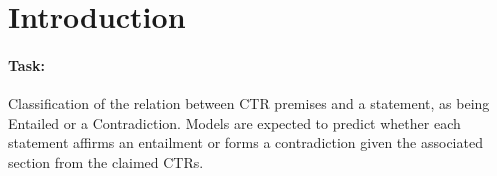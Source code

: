 \section{Introduction}\label{sec:introduction}

\paragraph{\textbf{Task:}} Classification of the relation between CTR premises and a 
statement, as being Entailed or a Contradiction. Models are expected to predict whether 
each statement affirms an entailment or forms a contradiction given the associated 
section from the claimed CTRs.








